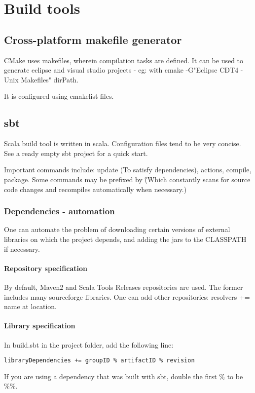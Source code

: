 \documentclass[oneside, article]{memoir}
\begin{document}
\chapter{Build tools}
\section{Cross-platform makefile generator}
CMake uses makefiles, wherein compilation tasks are defined. It can be used to generate eclipse and visual studio projects - eg: with cmake -G"Eclipse CDT4 - Unix Makefiles" dirPath.

It is configured using cmakelist files.

\section{sbt}
Scala build tool is written in scala. Configuration files tend to be very concise. See a ready empty sbt project for a quick start.

Important commands include: update (To satisfy dependencies), actions, compile, package. Some commands may be prefixed by \~ (Which constantly scans for source code changes and recompiles automatically when necessary.)

\subsection{Dependencies - automation}
One can automate the problem of downloading certain versions of external libraries on which the project depends, and adding the jars to the CLASSPATH if necessary.

\subsubsection{Repository specification}
By default, Maven2 and Scala Tools Releases repositories are used. The former includes many sourceforge libraries. One can add other repositories: resolvers += name at location.

\subsubsection{Library specification}
In build.sbt in the project folder, add the following line:
\begin{verbatim}
libraryDependencies += groupID % artifactID % revision
\end{verbatim}
If you are using a dependency that was built with sbt, double the first \% to be \%\%.
\end{document}
